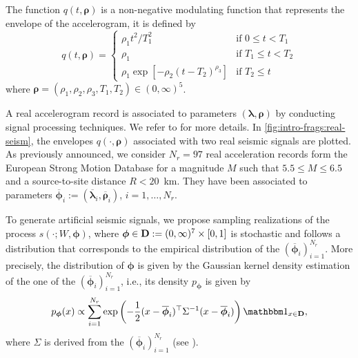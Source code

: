  The function $q(t,\boldsymbol\rho)$ is a
 non-negative modulating function that represents the envelope of the accelerogram, it is defined by
    \begin{equation}
        q(t,\boldsymbol\rho) = \left\lbrace \begin{array}{ll}
            \rho_1t^2/T_1^2 & \text{if\ } 0\leq t< T_1 \\
            \rho_1 & \text{if\ }T_1\leq t< T_2\\
            \rho_1\exp\left[-\rho_2(t-T_2)^{\rho_3}\right] &\text{if\ }T_2\leq t
        \end{array}\right.
    \end{equation}
where $\boldsymbol\rho=(\rho_1,\rho_2,\rho_3,T_1,T_2)\in(0,\infty)^5$.


A real accelerogram record is associated to parameters $(\boldsymbol{\lambda},\boldsymbol{\rho})$ by conducting signal processing techniques. We refer to \cite{rezaeian_stochastic_2008} for more details.
In \cref{fig:intro-frags:real-seism}, the envelopes $q(\cdot,\boldsymbol{\rho})$ associated with two real seismic signals are plotted.
As previously announced,
we consider $N_r=97$ real acceleration records form the European Strong Motion Database for a magnitude $M$ such that $5.5\leq M\leq 6.5$ and a source-to-site distance $R<20$~km. They have been associated to parameters $\overline{\boldsymbol{\phi}}_i:=(\overline{\boldsymbol{\lambda}}_i,\overline{\boldsymbol{\rho}}_i)$, $i=1,\dots,N_r$.



To generate artificial seismic signals, we propose sampling realizations of the process $s(\cdot;W,\boldsymbol{\phi})$, where $\boldsymbol{\phi}\in\mathbf{D}:=(0,\infty)^7\times[0,1]$ is stochastic and follows a distribution that corresponds to the empirical distribution of the $(\overline{\boldsymbol{\phi}}_i)_{i=1}^{N_r}$. More precisely, the distribution of $\boldsymbol{\phi}$ is  given by the Gaussian kernel density estimation %
of the one of the $(\overline{\boldsymbol\phi}_i)_{i=1}^{N_r}$, i.e., its density $p_{\boldsymbol{\phi}}$ is given by
\begin{equation}
    p_{\boldsymbol{\phi}}(x) \propto \sum_{i=1}^{N_r}\exp\left( -\frac{1}{2} (x-\overline{\boldsymbol\phi}_i)^\top\Sigma^{-1}(x-\overline{\boldsymbol\phi}_i) \right)\indic_{x\in\mbf D},
\end{equation}
where $\Sigma$ is derived from the $(\overline{\boldsymbol{\phi}}_i)_{i=1}^{N_r}$ (see \cite{kristan_multivariate_2011}).

